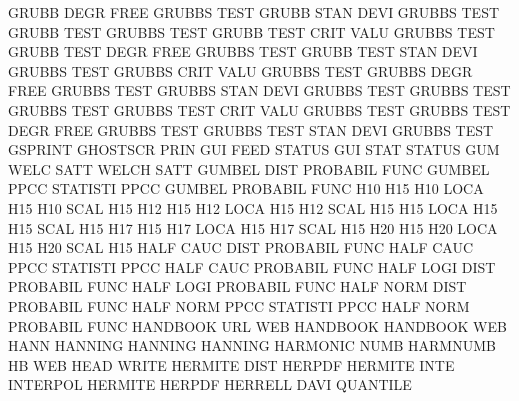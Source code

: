 GRUBB    DEGR FREE                      GRUBBS   TEST
GRUBB    STAN DEVI                      GRUBBS   TEST
GRUBB    TEST                           GRUBBS   TEST
GRUBB    TEST CRIT VALU                 GRUBBS   TEST
GRUBB    TEST DEGR FREE                 GRUBBS   TEST
GRUBB    TEST STAN DEVI                 GRUBBS   TEST
GRUBBS   CRIT VALU                      GRUBBS   TEST
GRUBBS   DEGR FREE                      GRUBBS   TEST
GRUBBS   STAN DEVI                      GRUBBS   TEST
GRUBBS   TEST                           GRUBBS   TEST
GRUBBS   TEST CRIT VALU                 GRUBBS   TEST
GRUBBS   TEST DEGR FREE                 GRUBBS   TEST
GRUBBS   TEST STAN DEVI                 GRUBBS   TEST
GSPRINT                                 GHOSTSCR PRIN
GUI      FEED                           STATUS
GUI      STAT                           STATUS
GUM      WELC SATT                      WELCH    SATT
GUMBEL   DIST                           PROBABIL FUNC
GUMBEL   PPCC                           STATISTI PPCC
GUMBEL                                  PROBABIL FUNC
H10                                     H15
H10      LOCA                           H15
H10      SCAL                           H15
H12                                     H15
H12      LOCA                           H15
H12      SCAL                           H15
H15      LOCA                           H15
H15      SCAL                           H15
H17                                     H15
H17      LOCA                           H15
H17      SCAL                           H15
H20                                     H15
H20      LOCA                           H15
H20      SCAL                           H15
HALF     CAUC DIST                      PROBABIL FUNC
HALF     CAUC PPCC                      STATISTI PPCC
HALF     CAUC                           PROBABIL FUNC
HALF     LOGI DIST                      PROBABIL FUNC
HALF     LOGI                           PROBABIL FUNC
HALF     NORM DIST                      PROBABIL FUNC
HALF     NORM PPCC                      STATISTI PPCC
HALF     NORM                           PROBABIL FUNC
HANDBOOK URL                            WEB      HANDBOOK
HANDBOOK                                WEB
HANN                                    HANNING
HANNING                                 HANNING
HARMONIC NUMB                           HARMNUMB
HB                                      WEB
HEAD                                    WRITE
HERMITE  DIST                           HERPDF
HERMITE  INTE                           INTERPOL
HERMITE                                 HERPDF
HERRELL  DAVI                           QUANTILE
